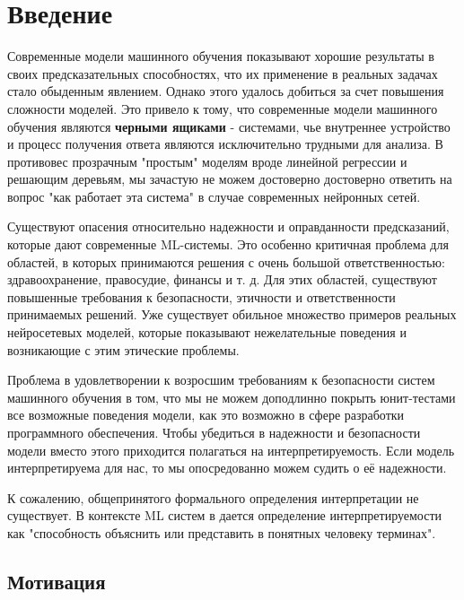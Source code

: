 \chapter{Введение}

Современные модели машинного обучения показывают хорошие результаты в своих предсказательных способностях, что их применение в реальных задачах стало обыденным явлением. Однако этого удалось добиться за счет повышения сложности моделей. Это привело к тому, что современные модели машинного обучения являются \textbf{черными ящиками} - системами, чье внутреннее устройство и процесс получения ответа являются исключительно трудными для анализа. В противовес прозрачным "простым" моделям вроде линейной регрессии и решающим деревьям, мы зачастую не можем достоверно достоверно ответить на вопрос "как работает эта система" в случае современных нейронных сетей.

Существуют опасения относительно надежности и оправданности предсказаний, которые дают современные ML-системы. Это особенно критичная проблема для областей, в которых принимаются решения с очень большой ответственностью: здравоохранение, правосудие, финансы и т. д.  Для этих областей, существуют повышенные требования к безопасности, этичности и ответственности принимаемых решений. Уже существует обильное множество примеров реальных нейросетевых моделей, которые показывают нежелательные поведения и возникающие с этим этические проблемы.

Проблема в удовлетворении к возросшим требованиям к безопасности систем машинного обучения в том, что мы не можем  доподлинно покрыть юнит-тестами все возможные поведения модели, как это возможно в сфере разработки программного обеспечения. Чтобы убедиться в надежности и безопасности модели вместо этого приходится полагаться на интерпретируемость. Если модель интерпретируема для нас, то мы опосредованно можем судить о её надежности.

К сожалению, общепринятого формального определения интерпретации не существует. В контексте ML систем в \cite{doshi-velezRigorousScienceInterpretable2017}  дается определение интерпретируемости как "способность объяснить или представить в понятных человеку терминах".


\section{Мотивация}

